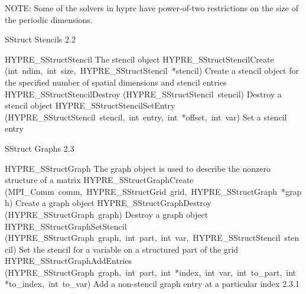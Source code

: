 \documentclass{article}
\begin{document}
\begin{cxxentry}
\begin{cxxentry}
\begin{cxxfunction}
\begin{cxxdoc}
NOTE: Some of the solvers in hypre have power-of-two restrictions on the size
of the periodic dimensions.
\end{cxxdoc}
\end{cxxfunction}
\end{cxxentry}
\begin{cxxentry}
{}
        {SStruct Stencils}
        {}
        {
}
        {2.2}
\begin{cxxnames}
        {HYPRE\_SStructStencil}
        {}
        {
The stencil object}
        {}
\label{cxx.2.2.1}
        {HYPRE\_SStructStencilCreate}
        {(int\ ndim,\ int\ size,\ HYPRE\_SStructStencil\ *stencil)}
        {
Create a stencil object for the specified number of spatial dimensions and
stencil entries}
        {}
\label{cxx.2.2.2}
        {HYPRE\_SStructStencilDestroy}
        {(HYPRE\_SStructStencil\ stencil)}
        {
Destroy a stencil object}
        {}
\label{cxx.2.2.3}
        {HYPRE\_SStructStencilSetEntry}
        {(HYPRE\_SStructStencil\ stencil,\ int\ entry,\ int\ *offset,\ int\ var)}
        {
Set a stencil entry}
        {}
\label{cxx.2.2.4}
\end{cxxnames}
\end{cxxentry}
\begin{cxxentry}
{}
        {SStruct Graphs}
        {}
        {
}
        {2.3}
\begin{cxxnames}
        {HYPRE\_SStructGraph}
        {}
        {
The graph object is used to describe the nonzero structure of a matrix}
        {}
\label{cxx.2.3.3}
        {HYPRE\_SStructGraphCreate}
        {(MPI\_Comm\ comm,\ HYPRE\_SStructGrid\ grid,\ HYPRE\_SStructGraph\ *graph)}
        {
Create a graph object}
        {}
\label{cxx.2.3.4}
        {HYPRE\_SStructGraphDestroy}
        {(HYPRE\_SStructGraph\ graph)}
        {
Destroy a graph object}
        {}
\label{cxx.2.3.5}
        {HYPRE\_SStructGraphSetStencil}
        {(HYPRE\_SStructGraph\ graph,\ int\ part,\ int\ var,\ HYPRE\_SStructStencil\ stencil)}
        {
Set the stencil for a variable on a structured part of the grid}
        {}
\label{cxx.2.3.6}
        {HYPRE\_SStructGraphAddEntries}
        {(HYPRE\_SStructGraph\ graph,\ int\ part,\ int\ *index,\ int\ var,\ int\ to\_part,\ int\ *to\_index,\ int\ to\_var)}
        {
Add a non-stencil graph entry at a particular index}
        {2.3.1}

\end{cxxnames}
\end{cxxentry}
\end{cxxentry}
\end{document}

